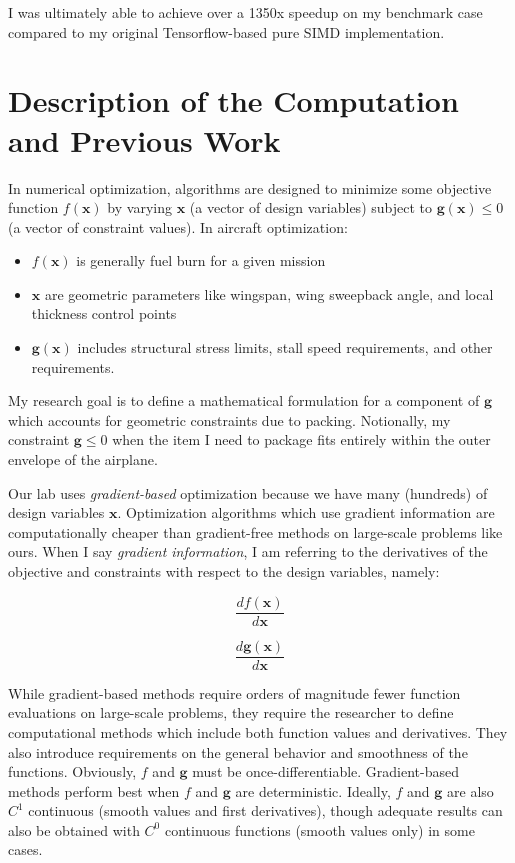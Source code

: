 \documentclass[11pt,letterpaper]{article}
\begin{document}
\qquad I was ultimately able to achieve over a 1350x speedup on my benchmark case compared to my original Tensorflow-based pure SIMD implementation. 

\section{Description of the Computation and Previous Work}
In numerical optimization, algorithms are designed to minimize some objective function $f(\textbf{x})$ by varying $\textbf{x}$ (a vector of design variables)
subject to $\textbf{g}(\textbf{x}) \leq 0$ (a vector of constraint values).
In aircraft optimization:
\begin{itemize}
 \item $f(\textbf{x})$ is generally fuel burn for a given mission
 \item $\textbf{x}$ are geometric parameters like wingspan, wing sweepback angle, and local thickness control points
 \item $\textbf{g}(\textbf{x})$ includes structural stress limits, stall speed requirements, and other requirements.
\end{itemize}
My research goal is to define a mathematical formulation for a component of $\textbf{g}$ which accounts for geometric constraints due to packing.
Notionally, my constraint $\textbf{g} \leq 0$ when the item I need to package fits entirely within the outer envelope of the airplane.

\qquad Our lab uses \emph{gradient-based} optimization because we have many (hundreds) of design variables $\textbf{x}$. 
Optimization algorithms which use gradient information are computationally cheaper than gradient-free methods on large-scale problems like ours.
When I say \emph{gradient information}, I am referring to the derivatives of the objective and constraints with respect to the design variables, namely:

\begin{equation}
    \frac{df(\textbf{x})}{d\textbf{x}}
\end{equation}

\begin{equation}
    \frac{d\textbf{g}(\textbf{x})}{d\textbf{x}}
\end{equation}

\qquad While gradient-based methods require orders of magnitude fewer function evaluations on large-scale problems, they require the researcher to define computational methods which include both function values and derivatives.
They also introduce requirements on the general behavior and smoothness of the functions.
Obviously, $f$ and $\textbf{g}$ must be once-differentiable.
Gradient-based methods perform best when $f$ and $\textbf{g}$ are deterministic.
Ideally, $f$ and $\textbf{g}$ are also $C^1$ continuous (smooth values and first derivatives), though adequate results can also be obtained with $C^0$ continuous functions (smooth values only) in some cases.
\end{document}

